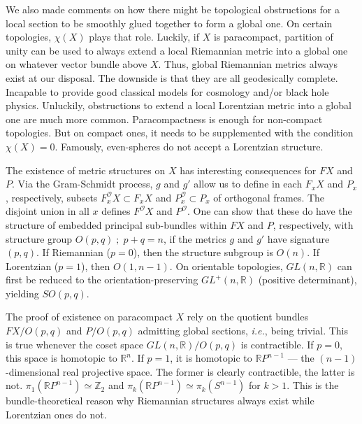 \documentclass[../../main.tex]{subfiles}
\begin{document}
We also made comments on how there might be topological obstructions for a local section to be smoothly glued together to form a global one. On certain topologies, $\chi\left(X\right)$ plays that role. Luckily, if $X$ is paracompact, partition of unity can be used to always extend a local Riemannian metric into a global one on whatever vector bundle above $X$. Thus, global Riemannian metrics always exist at our disposal. The downside is that they are all geodesically complete. Incapable to provide good classical models for cosmology and/or black hole physics. Unluckily, obstructions to extend a local Lorentzian metric into a global one are much more common. Paracompactness is enough for non-compact topologies. But on compact ones, it needs to be supplemented with the condition $\chi\left(X\right)=0$. Famously, even-spheres do not accept a Lorentzian structure.

The existence of metric structures on $X$ has interesting consequences for $FX$ and $P$. Via the Gram-Schmidt process, $g$ and $g'$ allow us to define in each $F_x X$ and $P_x$, respectively, subsets $F^\mathcal{O}_x X \subset F_x X$ and $P^\mathcal{O}_x \subset P_x$ of orthogonal frames. The disjoint union in all $x$ defines $F^\mathcal{O}X$ and $P^\mathcal{O}$. One can show that these do have the structure of embedded principal sub-bundles within $FX$ and $P$, respectively, with structure group $O\left(p,q \right) \; ; \; p+q=n$, if the metrics $g$ and $g'$ have signature $\left(p,q\right)$. If Riemannian ($p=0$), then the structure subgroup is $O\left(n\right)$. If Lorentzian ($p=1$), then $O\left(1,n-1\right)$. On orientable topologies, $GL\left(n,\mathbb{R}\right)$ can first be reduced to the orientation-preserving $GL^+\left(n,\mathbb{R}\right)$ (positive determinant), yielding $SO\left(p,q\right)$.

The proof of existence on paracompact $X$ rely on the quotient bundles $FX/O\left(p,q\right)$ and $P/O\left(p,q\right)$ admitting global sections, \textit{i.e.}, being trivial. This is true whenever the coset space $GL\left(n,\mathbb{R}\right)/O\left(p,q\right)$ is contractible. If $p=0$, this space is homotopic to $\mathbb{R}^n$. If $p=1$, it is homotopic to $\mathbb{R}P^{n-1}$ --- the $\left(n-1\right)$-dimensional real projective space. The former is clearly contractible, the latter is not. $\pi_1 \left(\mathbb{R}P^{n-1}\right) \simeq \mathbb{Z}_2$ and $\pi_k\left(\mathbb{R}P^{n-1}\right) \simeq \pi_k\left(S^{n-1}\right)$ for $k>1$. This is the bundle-theoretical reason why Riemannian structures always exist while Lorentzian ones do not.
\end{document}
